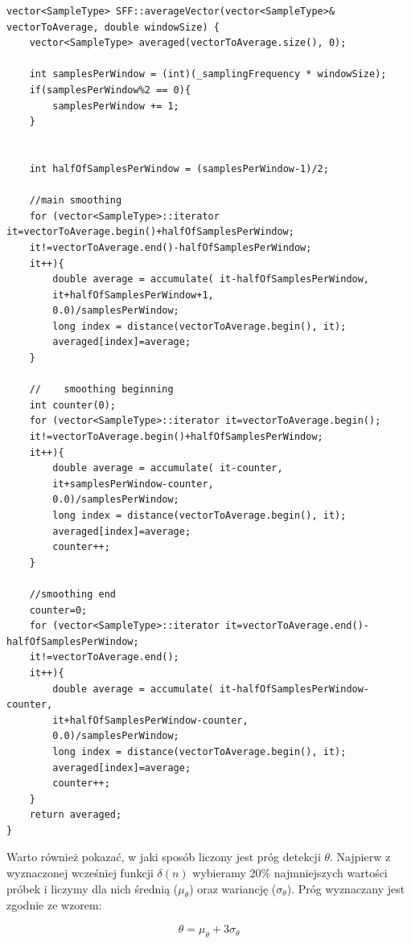 \documentclass[eng,printmode]{mgr}
\begin{document}
\lstset{language=C++,basicstyle=\scriptsize}
\begin{lstlisting}
vector<SampleType> SFF::averageVector(vector<SampleType>& vectorToAverage, double windowSize) {
	vector<SampleType> averaged(vectorToAverage.size(), 0);
	
	int samplesPerWindow = (int)(_samplingFrequency * windowSize);
	if(samplesPerWindow%2 == 0){
		samplesPerWindow += 1;
	}
	
	
	int halfOfSamplesPerWindow = (samplesPerWindow-1)/2;
	
	//main smoothing
	for (vector<SampleType>::iterator it=vectorToAverage.begin()+halfOfSamplesPerWindow;
	it!=vectorToAverage.end()-halfOfSamplesPerWindow;
	it++){
		double average = accumulate( it-halfOfSamplesPerWindow,
		it+halfOfSamplesPerWindow+1,
		0.0)/samplesPerWindow;
		long index = distance(vectorToAverage.begin(), it);
		averaged[index]=average;
	}
	
	//    smoothing beginning
	int counter(0);
	for (vector<SampleType>::iterator it=vectorToAverage.begin();
	it!=vectorToAverage.begin()+halfOfSamplesPerWindow;
	it++){
		double average = accumulate( it-counter,
		it+samplesPerWindow-counter,
		0.0)/samplesPerWindow;
		long index = distance(vectorToAverage.begin(), it);
		averaged[index]=average;
		counter++;
	}
	
	//smoothing end
	counter=0;
	for (vector<SampleType>::iterator it=vectorToAverage.end()-halfOfSamplesPerWindow;
	it!=vectorToAverage.end();
	it++){
		double average = accumulate( it-halfOfSamplesPerWindow-counter,
		it+halfOfSamplesPerWindow-counter,
		0.0)/samplesPerWindow;
		long index = distance(vectorToAverage.begin(), it);
		averaged[index]=average;
		counter++;
	}
	return averaged;
}
\end{lstlisting}\vspace{5mm}

Warto również pokazać, w jaki sposób liczony jest próg detekcji $\theta$. Najpierw z wyznaczonej wcześniej funkcji $\delta(n)$ wybieramy 20\% najmniejszych wartości próbek i liczymy dla nich średnią ($\mu_{\theta}$) oraz wariancję ($\sigma_{\theta}$). Próg wyznaczany jest zgodnie ze wzorem:

$$\theta = \mu_{\theta} + 3\sigma_{\theta}$$
\end{document}
